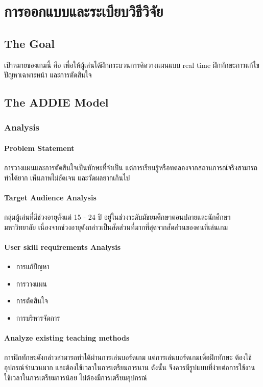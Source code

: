 \documentclass[12pt,oneside,openright,a4paper]{cpe-thai-project}
\begin{document}
\chapter{การออกแบบและระเบียบวิธีวิจัย}

\section{The Goal}
เป้าหมายของเกมนี้ คือ เพื่อให้ผู้เล่นได้ฝึกกระบวนการคิดวางแผนแบบ real time 
ฝึกทักษะการแก้ไขปัญหาเฉพาะหน้า และการตัดสินใจ

\section{The ADDIE Model}


\subsection{Analysis}

\subsubsection{Problem Statement}
การวางแผนและการตัดสินใจเป็นทักษะที่จำเป็น แต่การเรียนรู้หรือทดลองจากสถานการณ์จริงสามารถทำได้ยาก 
เห็นภาพไม่ชัดเจน และวัดผลยากเกินไป

\subsubsection{Target Audience Analysis}
กลุ่มผู้เล่นที่มีช่วงอายุตั้งแต่ 15 - 24 ปี อยู่ในช่วงระดับมัธยมศึกษาตอนปลายและนักศึกษามหาวิทยาลัย 
เนื่องจากช่วงอายุดังกล่าวเป็นสัดส่วนที่มากที่สุดจากสัดส่วนของคนที่เล่นเกม 

\subsubsection{User skill requirements Analysis}
\begin{itemize}
  \item การแก้ปัญหา
  \item การวางแผน
  \item การตัดสินใจ
  \item การบริหารจัดการ
\end{itemize}

\subsubsection{Analyze existing teaching methods}
การฝึกทักษะดังกล่าวสามารถทำได้ผ่านการเล่นบอร์ดเกม แต่การเล่นบอร์ดเกมเพื่อฝึกทักษะ 
ต้องใช้อุปกรณ์จำนวนมาก และต้องใช้เวลาในการเตรียมการนาน ดังนั้น จึงควรมีรูปแบบที่ง่ายต่อการใช้งาน 
ใช้เวลาในการเตรียมการน้อย ไม่ต้องมีการเตรียมอุปกรณ์
\end{document}

